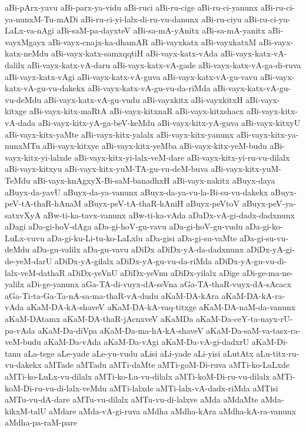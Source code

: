 {aBi-pArx-yavu
aBi-parx-ya-vidu
aBi-ruci
aBi-ru-cige
aBi-ru-ci-yanunx
aBi-ru-ci-ya-nunxM-Tu-mADi
aBi-ru-ci-yi-lalx-di-ru-vu-danunx
aBi-ru-ciyu
aBi-ru-ci-yu-LaLx-va-nAgi
aBi-saM-pa-dayxteV
aBi-sa-mA-yAnitx
aBi-sa-mA-yanitx
aBi-vayxMgayx
aBi-vayx-cnajx-ka-dhamAR
aBi-vayxkatx
aBi-vayxkatxM
aBi-vayx-katx-neMdu
aBi-vayx-katx-samxqqtiH
aBi-vayx-katx-vAda
aBi-vayx-katx-vA-dalilx
aBi-vayx-katx-vA-daru
aBi-vayx-katx-vA-gade
aBi-vayx-katx-vA-ga-di-ruva
aBi-vayx-katx-vAgi
aBi-vayx-katx-vA-guva
aBi-vayx-katx-vA-gu-vavu
aBi-vayx-katx-vA-gu-vu-dakekx
aBi-vayx-katx-vA-gu-vu-da-riMda
aBi-vayx-katx-vA-gu-vu-deMdu
aBi-vayx-katx-vA-gu-vudu
aBi-vayxkitx
aBi-vayxkitxH
aBi-vayx-kitxge
aBi-vayx-kitx-maRtA
aBi-vayx-kitxnaR
aBi-vayx-kitxshacx
aBi-vayx-kitx-vA-dada
aBi-vayx-kitx-yA-ga-beV-keMdu
aBi-vayx-kitx-yA-guva
aBi-vayx-kitxyU
aBi-vayx-kitx-yaMte
aBi-vayx-kitx-yalalx
aBi-vayx-kitx-yanunx
aBi-vayx-kitx-ya-nunxMTu
aBi-vayx-kitxye
aBi-vayx-kitx-yeMba
aBi-vayx-kitx-yeM-budu
aBi-vayx-kitx-yi-lalxde
aBi-vayx-kitx-yi-lalx-veM-dare
aBi-vayx-kitx-yi-ru-vu-dilalx
aBi-vayx-kitxyu
aBi-vayx-kitx-yuM-TA-gu-vu-deM-buva
aBi-vayx-kitx-yuM-TeMdu
aBi-vayx-knAgxyX-Bi-saM-banadhxH
aBi-vayx-nakitx
aBuyx-daya
aBuyx-da-yavU
aBuyx-da-ya-vanunx
aBuyx-da-ya-vu-la-Bi-su-vu-dakekx
aBuyx-peV-tA-thaR-hAnaM
aBuyx-peV-tA-thaR-hAniH
aBuyx-peVtoV
aBuyx-peV-ya-satxvXyA
aBw-ti-ka-tavx-vanunx
aBw-ti-ka-vAda
aDaDx-vA-gi-dadx-dadxnunx
aDagi
aDa-gi-hoV-dAga
aDa-gi-hoV-gu-vavu
aDa-gi-hoV-gu-vudu
aDa-gi-ko-LuLx-vuvu
aDa-gi-ku-Li-tu-ko-LaLxlu
aDa-gisi
aDa-gi-su-vaMte
aDa-gi-su-vu-deMdu
aDa-gu-valilx
aDa-gu-vavu
aDiDx
aDiDx-yA-da-dadxnunx
aDiDx-yA-gi-de-yeM-darU
aDiDx-yA-gilalx
aDiDx-yA-gu-vu-da-riMda
aDiDx-yA-gu-vu-di-lalx-veM-dathaR
aDiDx-yeVnU
aDiDx-yeVnu
aDiDx-yilalx
aDige
aDi-ge-ma-ne-yalilx
aDi-ge-yanunx
aGa-TA-di-vuyx-dA-seVna
aGa-TA-thaR-vuyx-dA-sAcacx
aGa-Ti-ta-Ga-Ta-nA-sa-ma-thaR-vA-dudu
aKaM-DA-kAra
aKaM-DA-kA-ra-vAda
aKaM-DA-kA-shaveV
aKaM-DA-kA-vaq-titxge
aKaM-DA-naM-da-vanunx
aKaM-DAtamx
aKaM-DA-thaR-jAcnxveV
aKaMDa
aKaM-Da-ceY-ta-nayx-rU-pa-vAda
aKaM-Da-diVpa
aKaM-Da-ma-hA-kA-shaveV
aKaM-Da-saM-va-tasx-ra-veM-budu
aKaM-Da-vAda
aKaM-Da-vAgi
aKaM-Da-vA-gi-dadxrU
aKaM-Di-tanu
aLa-tege
aLe-yade
aLe-yu-vudu
aLisi
aLi-yade
aLi-yisi
aLutAtx
aLu-titx-ru-vu-dakekx
aMTade
aMTadu
aMTi-daMte
aMTi-goM-Di-ruva
aMTi-ko-LaLxde
aMTi-ko-LuLx-vu-dilalx
aMTi-ko-Lu-vu-dilalx
aMTi-koM-Di-ru-vu-dilalx
aMTi-koM-Di-ru-vu-di-lalx-veMdu
aMTi-lalxde
aMTi-lalx-vA-dadx-riMda
aMTisi
aMTu-vu-dA-dare
aMTu-vu-dilalx
aMTu-vu-di-lalxve
aMda
aMdaMte
aMda-kikxM-talU
aMdare
aMda-vA-gi-ruva
aMdha
aMdha-kAra
aMdha-kA-ra-vanunx
aMdha-pa-raM-pare
}
